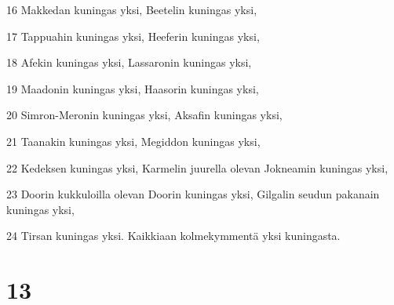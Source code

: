 \par 16 Makkedan kuningas yksi, Beetelin kuningas yksi,
\par 17 Tappuahin kuningas yksi, Heeferin kuningas yksi,
\par 18 Afekin kuningas yksi, Lassaronin kuningas yksi,
\par 19 Maadonin kuningas yksi, Haasorin kuningas yksi,
\par 20 Simron-Meronin kuningas yksi, Aksafin kuningas yksi,
\par 21 Taanakin kuningas yksi, Megiddon kuningas yksi,
\par 22 Kedeksen kuningas yksi, Karmelin juurella olevan Jokneamin kuningas yksi,
\par 23 Doorin kukkuloilla olevan Doorin kuningas yksi, Gilgalin seudun pakanain kuningas yksi,
\par 24 Tirsan kuningas yksi. Kaikkiaan kolmekymmentä yksi kuningasta.

\chapter{13}

